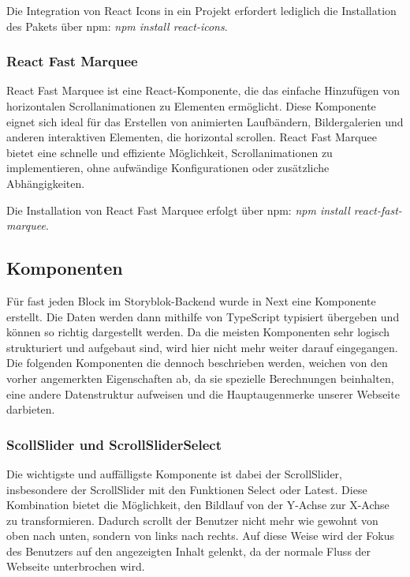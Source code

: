 Die Integration von React Icons in ein Projekt erfordert lediglich die Installation des Pakets über npm: \emph{npm install react-icons}.

\subsubsection*{React Fast Marquee}
React Fast Marquee ist eine React-Komponente, die das einfache Hinzufügen von horizontalen Scrollanimationen zu Elementen ermöglicht. Diese Komponente eignet sich ideal für das Erstellen von animierten Laufbändern, Bildergalerien und anderen interaktiven Elementen, die horizontal scrollen. React Fast Marquee bietet eine schnelle und effiziente Möglichkeit, Scrollanimationen zu implementieren, ohne aufwändige Konfigurationen oder zusätzliche Abhängigkeiten. 

Die Installation von React Fast Marquee erfolgt über npm: \emph{npm install react-fast-marquee}.

\subsection{Komponenten}

Für fast jeden Block im Storyblok-Backend wurde in Next eine Komponente erstellt. Die Daten werden dann mithilfe von TypeScript typisiert übergeben und können so richtig dargestellt werden. Da die meisten Komponenten sehr logisch strukturiert und aufgebaut sind, wird hier nicht mehr weiter darauf eingegangen. Die folgenden Komponenten die dennoch beschrieben werden, weichen von den vorher angemerkten Eigenschaften ab, da sie spezielle Berechnungen beinhalten, eine andere Datenstruktur aufweisen und die Hauptaugenmerke unserer Webseite darbieten.

\subsubsection*{ScollSlider und ScrollSliderSelect}

Die wichtigste und auffälligste Komponente ist dabei der ScrollSlider, insbesondere der ScrollSlider mit den Funktionen Select oder Latest. Diese Kombination bietet die Möglichkeit, den Bildlauf von der Y-Achse zur X-Achse zu transformieren. Dadurch scrollt der Benutzer nicht mehr wie gewohnt von oben nach unten, sondern von links nach rechts. Auf diese Weise wird der Fokus des Benutzers auf den angezeigten Inhalt gelenkt, da der normale Fluss der Webseite unterbrochen wird.

